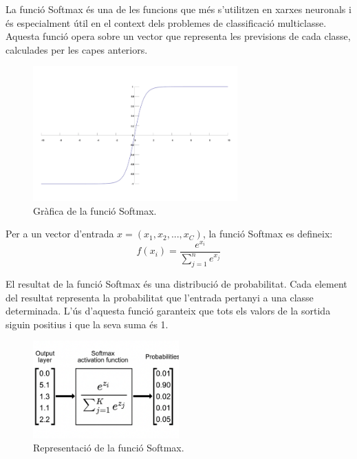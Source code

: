 \begin{enumerate}
    La funció Softmax és una de les funcions que més s'utilitzen en xarxes neuronals i és especialment útil en el context dels problemes de classificació multiclasse. Aquesta funció opera sobre un vector que representa les previsions de cada classe, calculades per les capes anteriors.

    \begin{figure}[H]
        \centering
        \includegraphics[width=0.7\textwidth]{./figures/Softmax.png}
        \caption{Gràfica de la funció Softmax.\cite{Img_softmax}}
    \end{figure}

    Per a un vector d'entrada $x =  \left( x_1,x_2 , ... , x_C \right)$, la funció Softmax es defineix:
    $$f(x_i) = \frac{e^{x_i}}{\sum_{j=1}^{n} e^{x_j}}$$

    El resultat de la funció Softmax és una distribució de probabilitat. Cada element del resultat representa la probabilitat que l'entrada pertanyi a una classe determinada. L'ús d'aquesta funció garanteix que tots els valors de la sortida siguin positius i que la seva suma és 1.

    \begin{figure}[H]
        \centering
        \includegraphics[width=0.5\textwidth]{./figures/representacio_Softmax.png}
        \caption{Representació de la funció Softmax.~\cite{Img2_softmax}}
    \end{figure}
\end{enumerate}

